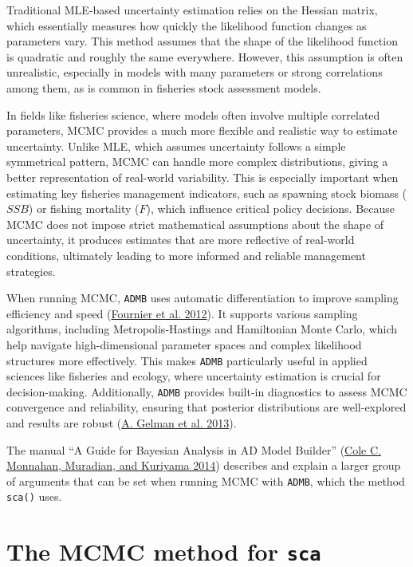 \documentclass[
]{book}
\begin{document}
Traditional MLE-based uncertainty estimation relies on the Hessian matrix, which essentially measures how quickly the likelihood function changes as parameters vary. This method assumes that the shape of the likelihood function is quadratic and roughly the same everywhere. However, this assumption is often unrealistic, especially in models with many parameters or strong correlations among them, as is common in fisheries stock assessment models.

In fields like fisheries science, where models often involve multiple correlated parameters, MCMC provides a much more flexible and realistic way to estimate uncertainty. Unlike MLE, which assumes uncertainty follows a simple symmetrical pattern, MCMC can handle more complex distributions, giving a better representation of real-world variability. This is especially important when estimating key fisheries management indicators, such as spawning stock biomass (\(SSB\)) or fishing mortality (\(F\)), which influence critical policy decisions. Because MCMC does not impose strict mathematical assumptions about the shape of uncertainty, it produces estimates that are more reflective of real-world conditions, ultimately leading to more informed and reliable management strategies.

When running MCMC, \texttt{ADMB} uses automatic differentiation to improve sampling efficiency and speed (\protect\hyperlink{ref-Fournier2012}{Fournier et al. 2012}). It supports various sampling algorithms, including Metropolis-Hastings and Hamiltonian Monte Carlo, which help navigate high-dimensional parameter spaces and complex likelihood structures more effectively. This makes \texttt{ADMB} particularly useful in applied sciences like fisheries and ecology, where uncertainty estimation is crucial for decision-making. Additionally, \texttt{ADMB} provides built-in diagnostics to assess MCMC convergence and reliability, ensuring that posterior distributions are well-explored and results are robust (\protect\hyperlink{ref-gelman2013bayesian}{A. Gelman et al. 2013}).

The manual ``A Guide for Bayesian Analysis in AD Model Builder'' (\protect\hyperlink{ref-monnahan2014admbmcmc}{Cole C. Monnahan, Muradian, and Kuriyama 2014}) describes and explain a larger group of arguments that can be set when running MCMC with \texttt{ADMB}, which the method \texttt{sca()} uses.

\hypertarget{the-mcmc-method-for-sca}{%
\section{\texorpdfstring{The MCMC method for \texttt{sca}}{The MCMC method for sca}}\label{the-mcmc-method-for-sca}}
\end{document}
